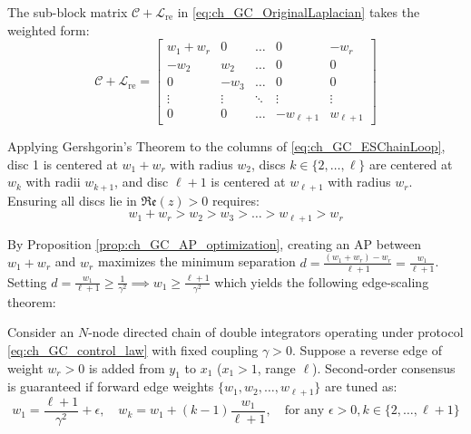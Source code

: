 The sub-block matrix $\mathcal{C} + \mathcal{L}_{\text{re}}$ in \eqref{eq:ch_GC_OriginalLaplacian} takes the weighted form:
\begin{equation}\label{eq:ch_GC_ESChainLoop}
	\mathcal{C} + \mathcal{L}_{\text{re}} = \begin{bmatrix}
		w_1 + w_r  & 0 & \dots & 0 & -w_r \\
		-w_2 & w_2 & \dots & 0 & 0 \\
		0 & -w_3 & \dots & 0 & 0 \\
		\vdots & \vdots & \ddots & \vdots & \vdots \\
		0 & 0 & \dots & -w_{\ell+1} & w_{\ell+1}
	\end{bmatrix}
\end{equation}

Applying Gershgorin's Theorem to the columns of \eqref{eq:ch_GC_ESChainLoop}, disc 1 is centered at $w_1 + w_r$ with radius $w_2$, discs $k \in \{2, \dots, \ell\}$ are centered at $w_k$ with radii $w_{k+1}$, and disc $\ell+1$ is centered at $w_{\ell+1}$ with radius $w_r$. Ensuring all discs lie in $\mathfrak{Re}(z) > 0$ requires:
\begin{equation}\label{eq:ch_GC_ESInequality}
	w_1 + w_r > w_2 > w_3 > \dots > w_{\ell+1} > w_r
\end{equation}

By Proposition \ref{prop:ch_GC_AP_optimization}, creating an AP between $w_1 + w_r$ and $w_r$ maximizes the minimum separation $d = \frac{(w_1 + w_r) - w_r}{\ell + 1} = \frac{w_1}{\ell + 1}$. Setting $d = \frac{w_1}{\ell + 1} \ge \frac{1}{\gamma^2} \implies w_1 \ge \frac{\ell+1}{\gamma^2}$ which yields the following edge-scaling theorem:

\begin{theo}\label{theo2}
Consider an $N$-node directed chain of double integrators operating under protocol \eqref{eq:ch_GC_control_law} with fixed coupling $\gamma > 0$. Suppose a reverse edge of weight $w_r > 0$ is added from $y_1$ to $x_1$ ($x_1 > 1$, range $\ell$). Second-order consensus is guaranteed if forward edge weights $\{w_1, w_2, \dots, w_{\ell+1}\}$ are tuned as:
\begin{equation}\label{eq:ch_GC_ESScalar_formula}
	w_1 = \frac{\ell+1}{\gamma^2} + \epsilon, \quad w_k = w_1 + (k-1) \frac{w_1}{\ell+1}, \quad \text{for any } \epsilon > 0, k \in \{2, \dots, \ell+1\}
\end{equation}
\end{theo}

